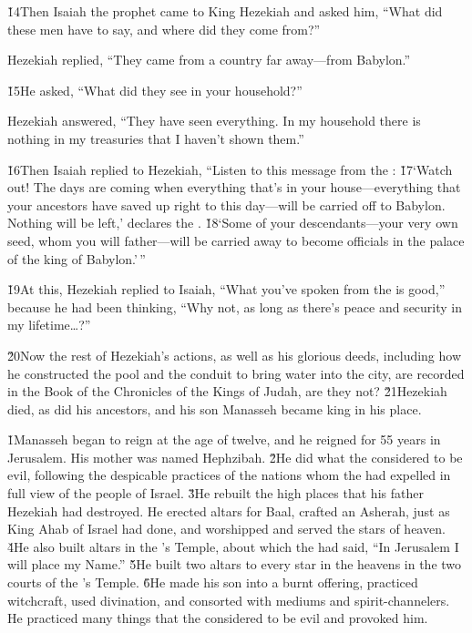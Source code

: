 \v{14}Then Isaiah the prophet came to King Hezekiah and asked him, ``What did these men have to say, and where did they come from?''

Hezekiah replied, ``They came from a country far away---from Babylon.''

\v{15}He asked, ``What did they see in your household?''

Hezekiah answered, ``They have seen everything. In my household there is nothing in my treasuries that I haven't shown them.''

\v{16}Then Isaiah replied to Hezekiah, ``Listen to this message from the : \v{17}`Watch out! The days are coming when everything that's in your house---everything that your ancestors have saved up right to this day---will be carried off to Babylon. Nothing will be left,' declares the . \v{18}`Some of your descendants---your very own seed, whom you will father---will be carried away to become officials in the palace of the king of Babylon.'\,''

\v{19}At this, Hezekiah replied to Isaiah, ``What you've spoken from the  is good,'' because he had been thinking, ``Why not, as long as there's peace and security in my lifetime{\ldots}?''

\v{20}Now the rest of Hezekiah's actions, as well as his glorious deeds, including how he constructed the pool and the conduit to bring water into the city, are recorded in the Book of the Chronicles of the Kings of Judah, are they not? \v{21}Hezekiah died, as did his ancestors, and his son Manasseh became king in his place.

\v{1}Manasseh began to reign at the age of twelve, and he reigned for 55 years in Jerusalem. His mother was named Hephzibah. \v{2}He did what the  considered to be evil, following the despicable practices of the nations whom the  had expelled in full view of the people of Israel. \v{3}He rebuilt the high places that his father Hezekiah had destroyed. He erected altars for Baal, crafted an Asherah, just as King Ahab of Israel had done, and worshipped and served the stars of heaven. \v{4}He also built altars in the 's Temple, about which the  had said, ``In Jerusalem I will place my Name.'' \v{5}He built two altars to every star in the heavens in the two courts of the 's Temple. \v{6}He made his son into a burnt offering, practiced witchcraft, used divination, and consorted with mediums and spirit-channelers. He practiced many things that the  considered to be evil and provoked him.

